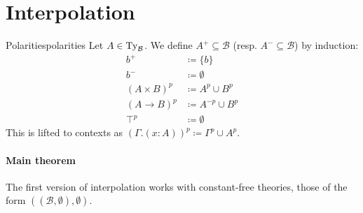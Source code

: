 \documentclass[10pt,a4paper]{notes-template}
\begin{document}
\section{Interpolation}


\begin{definition}{Polarities}{polarities}
  Let \(A \in \operatorname{Ty}_{\mathcal{B}}\). We define \(A^+ \subseteq \mathcal{B}\)
    (resp. \(A^- \subseteq \mathcal{B}\)) by induction:\pagebreak
  \begin{align*}
    b^{+} & \coloneq \{b\} \\
    b^{-} & \coloneq \emptyset \\
    (A \times B)^{p} & \coloneq A^p \cup B^p \\
    (A \to B)^{p} & \coloneq A^{-p} \cup B^p \\
    \top^p & \coloneq \emptyset
  \end{align*}
  This is lifted to contexts as
  \((\Gamma.(x : A))^p \coloneq \Gamma^p \cup A^p\).
\end{definition}

\paragraph{Main theorem}

The first version of interpolation works with constant-free theories, \ie those
of the form \(((\mathcal{B},\emptyset),\emptyset)\).
\end{document}
